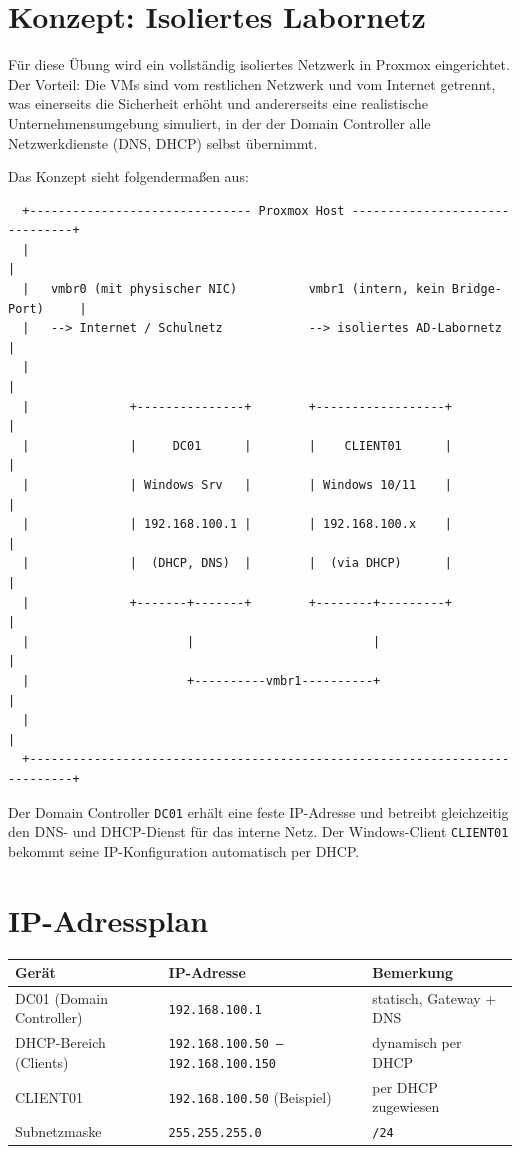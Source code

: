 \documentclass[11pt, oneside, numbers=noenddot]{scrbook}
\begin{document}
\section{Konzept: Isoliertes Labornetz}
Für diese Übung wird ein vollständig isoliertes Netzwerk in Proxmox eingerichtet. Der Vorteil: Die VMs sind vom restlichen Netzwerk und vom Internet getrennt, was einerseits die Sicherheit erhöht und andererseits eine realistische Unternehmensumgebung simuliert, in der der Domain Controller alle Netzwerkdienste (DNS, DHCP) selbst übernimmt.

Das Konzept sieht folgendermaßen aus:

\begin{verbatim}
  +------------------------------- Proxmox Host -------------------------------+
  |                                                                            |
  |   vmbr0 (mit physischer NIC)          vmbr1 (intern, kein Bridge-Port)     |
  |   --> Internet / Schulnetz            --> isoliertes AD-Labornetz          |
  |                                                                            |
  |              +---------------+        +------------------+                 |
  |              |     DC01      |        |    CLIENT01      |                 |
  |              | Windows Srv   |        | Windows 10/11    |                 |
  |              | 192.168.100.1 |        | 192.168.100.x    |                 |
  |              |  (DHCP, DNS)  |        |  (via DHCP)      |                 |
  |              +-------+-------+        +--------+---------+                 |
  |                      |                         |                           |
  |                      +----------vmbr1----------+                           |
  |                                                                            |
  +----------------------------------------------------------------------------+
\end{verbatim}

Der Domain Controller \texttt{DC01} erhält eine feste IP-Adresse und betreibt gleichzeitig den DNS- und DHCP-Dienst für das interne Netz. Der Windows-Client \texttt{CLIENT01} bekommt seine IP-Konfiguration automatisch per DHCP.

\section{IP-Adressplan}

\begin{center}
\begin{tabular}{|l|l|l|}
\hline
\textbf{Gerät} & \textbf{IP-Adresse} & \textbf{Bemerkung} \\
\hline
DC01 (Domain Controller) & \texttt{192.168.100.1} & statisch, Gateway + DNS \\
DHCP-Bereich (Clients) & \texttt{192.168.100.50 -- 192.168.100.150} & dynamisch per DHCP \\
CLIENT01 & \texttt{192.168.100.50} (Beispiel) & per DHCP zugewiesen \\
Subnetzmaske & \texttt{255.255.255.0} & \texttt{/24} \\
\hline
\end{tabular}
\end{center}
\end{document}
